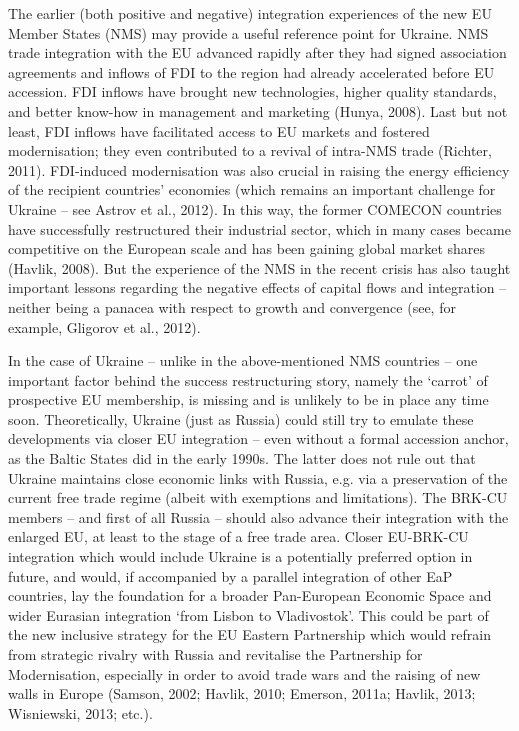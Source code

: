 The earlier (both positive and negative) integration experiences of the new EU Member States (NMS) may provide a useful reference point for Ukraine. NMS trade integration with the EU advanced rapidly after they had signed association agreements and inflows of FDI to the region had already accelerated before EU accession. FDI inflows have brought new technologies, higher quality standards, and better know-how in management and marketing (Hunya, 2008). Last but not least, FDI inflows have facilitated access to EU markets and fostered modernisation; they even contributed to a revival of intra-NMS trade (Richter, 2011). FDI-induced modernisation was also crucial in raising the energy efficiency of the recipient countries' economies (which remains an important challenge for Ukraine -- see Astrov et al., 2012). In this way, the former COMECON countries have successfully restructured their industrial sector, which in many cases became competitive on the European scale and has been gaining global market shares (Havlik, 2008). But the experience of the NMS in the recent crisis has also taught important lessons regarding the negative effects of capital flows and integration -- neither being a panacea with respect to growth and convergence (see, for example, Gligorov et al., 2012).

In the case of Ukraine -- unlike in the above-mentioned NMS countries -- one important factor behind the success restructuring story, namely the `carrot' of prospective EU membership, is missing and is unlikely to be in place any time soon. Theoretically, Ukraine (just as Russia) could still try to emulate these developments via closer EU integration -- even without a formal accession anchor, as the Baltic States did in the early 1990s. The latter does not rule out that Ukraine maintains close economic links with Russia, e.g. via a preservation of the current free trade regime (albeit with exemptions and limitations). The BRK-CU members -- and first of all Russia -- should also advance their integration with the enlarged EU, at least to the stage of a free trade area. Closer EU-BRK-CU integration which would include Ukraine is a potentially preferred option in future, and would, if accompanied by a parallel integration of other EaP countries, lay the foundation for a broader Pan-European Economic Space and wider Eurasian integration `from Lisbon to Vladivostok'. This could be part of the new inclusive strategy for the EU Eastern Partnership which would refrain from strategic rivalry with Russia and revitalise the Partnership for Modernisation, especially in order to avoid trade wars and the raising of new walls in Europe (Samson, 2002; Havlik, 2010; Emerson, 2011a; Havlik, 2013; Wisniewski, 2013; etc.).

